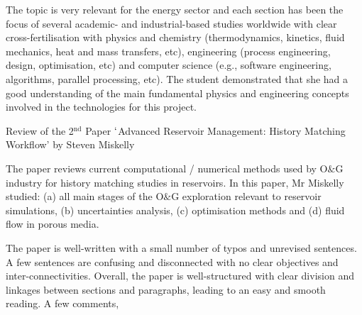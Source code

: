 \documentclass[14pt,twoside]{report}
\begin{document}
The topic is very relevant for the energy sector and each section has been the focus of several academic- and industrial-based studies worldwide with clear cross-fertilisation with physics and chemistry (thermodynamics, kinetics, fluid mechanics, heat and mass transfers, etc), engineering (process engineering, design, optimisation, etc) and computer science (e.g., software engineering, algorithms, parallel processing, etc).  The student demonstrated that she had a good understanding of the main fundamental physics and engineering concepts involved in the technologies for this project.



\clearpage


\bigskip

\begin{center}
  {\Large Review of the 2$^{\text{nd}}$ Paper $\lq$Advanced Reservoir Management: History Matching Workflow' by Steven Miskelly}
\end{center}

The paper reviews current computational / numerical methods used by O$\&$G industry for history matching studies in reservoirs.  In this paper, Mr Miskelly studied: (a) all main stages of the O$\&$G exploration relevant to reservoir simulations, (b) uncertainties analysis, (c) optimisation methods and (d) fluid flow in porous media.

The paper is well-written with a small number of typos and unrevised sentences. A few sentences are confusing and disconnected with no clear objectives and inter-connectivities. Overall, the paper is well-structured with clear division and linkages between sections and paragraphs, leading to an easy and smooth reading. A few comments,
\end{document}
